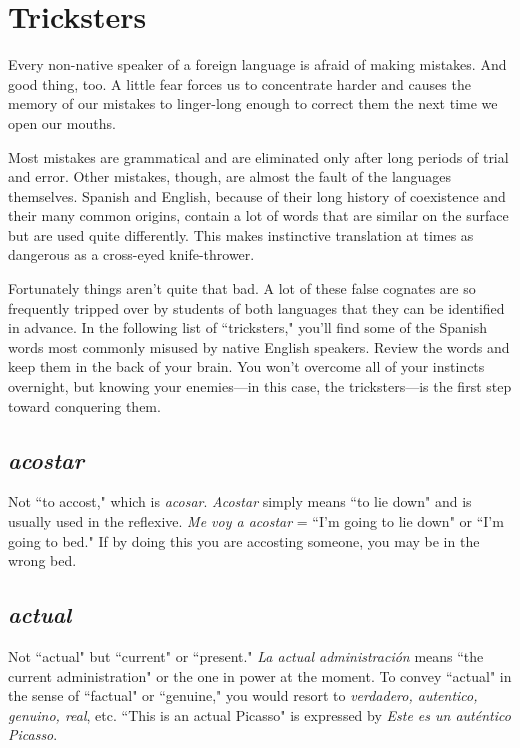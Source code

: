 \chapter{Tricksters}

Every non-native speaker of a foreign language is afraid of
making mistakes. And good thing, too. A little fear forces us to concentrate harder and causes the memory of our mistakes to linger-long
enough to correct them the next time we open our mouths.

Most mistakes are grammatical and are eliminated only after
long periods of trial and error. Other mistakes, though, are almost the
fault of the languages themselves. Spanish and English, because of
their long history of coexistence and their many common origins, contain a lot of words that are similar on the surface but are used quite
differently. This makes instinctive translation at times as dangerous as
a cross-eyed knife-thrower.

Fortunately things aren't quite that bad. A lot of these false
cognates are so frequently tripped over by students of both languages
that they can be identified in advance. In the following list of ``tricksters," you'll find some of the Spanish words most commonly misused
by native English speakers. Review the words and keep them in the
back of your brain. You won't overcome all of your instincts overnight,
but knowing your enemies---in this case, the tricksters---is the first
step toward conquering them.

\section{\emph{acostar}}

Not ``to accost," which is \emph{acosar}. \emph{Acostar} simply
means ``to lie down" and is usually used in the reflexive. \emph{Me voy a
	acostar} = ``I'm going to lie down" or ``I'm going to bed." If by doing
this you are accosting someone, you may be in the wrong bed.

\section{\emph{actual}}

Not ``actual" but ``current" or ``present." \emph{La actual
	administración} means ``the current administration" or the one in power
at the moment. To convey ``actual" in the sense of ``factual" or ``genuine," you would resort to \emph{verdadero, autentico, genuino, real}, etc. ``This
is an actual Picasso" is expressed by \emph{Este es un auténtico Picasso}.

